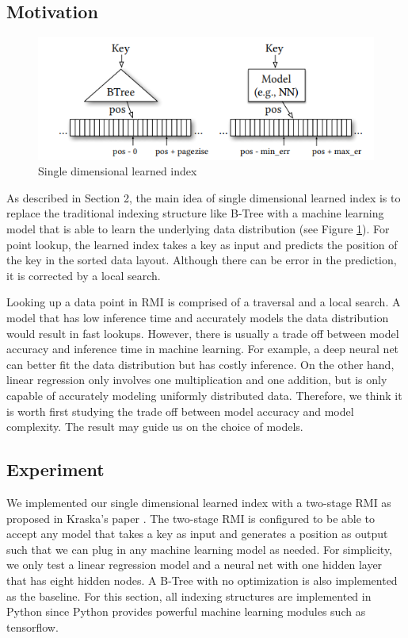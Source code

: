 \documentclass[sigconf,10pt]{acmart}
\begin{document}
\subsection{Motivation}

\begin{figure}[h]
  \includegraphics[scale=0.6]{../figures/single-dim-learned-index}
  \caption{Single dimensional learned index \cite{Learned_Index}}
  \label{single-dimensional-learned-index}
\end{figure}

As described in Section 2, the main idea of single dimensional learned index is to replace
the traditional indexing structure like B-Tree with a machine learning model that is able
to learn the underlying data distribution (see Figure \ref{single-dimensional-learned-index}).
For point lookup, the learned index takes a key as input and predicts the position of the key 
in the sorted data layout. Although there can be error in the prediction, it is corrected by a local search.

Looking up a data point in RMI is comprised of a traversal and a local search. 
A model that has low inference time and accurately models the data distribution would result in fast lookups.
However, there is usually a trade off between model accuracy and inference time in machine learning. 
For example, a deep neural net can better fit the data distribution but has costly inference.
On the other hand, linear regression only involves one multiplication and one addition, but is only capable of 
accurately modeling uniformly distributed data.
Therefore, we think it is worth first studying the trade off between model accuracy and model
complexity. The result may guide us on the choice of models. 

\subsection{Experiment}

We implemented our single dimensional learned index with a two-stage RMI as proposed in 
Kraska's paper \cite{Learned_Index}. The two-stage RMI is configured to be able to accept
any model that takes a key as input and generates a position as output such that we can
plug in any machine learning model as needed. For simplicity, we only test a linear regression
model and a neural net with one hidden layer that has eight hidden nodes. 
A B-Tree with no optimization is also implemented as the baseline. 
For this section, all indexing structures are implemented in Python 
since Python provides powerful machine learning modules such as tensorflow. 
\end{document}
